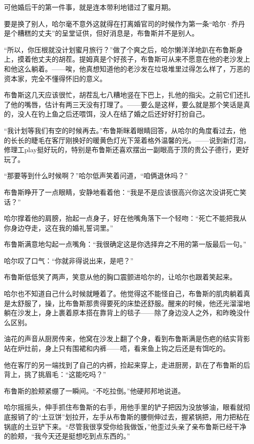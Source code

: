 \documentclass[../main]{subfiles}
\begin{document}
可他婚后干的第一件事，就是连本带利地错过了蜜月期。

要是换了别人，哈尔毫不意外这就得在打离婚官司的时候作为第一条“哈尔·乔丹是个糟糕的丈夫”的呈堂证供，但好消息是，布鲁斯并不是别人。

“所以，你压根就没计划蜜月旅行？”做了个爽之后，哈尔懒洋洋地趴在布鲁斯身上，摸着他丈夫的胡茬。提姆真是个好孩子，布鲁斯可从来不愿意在他的老沙发上和他这么躺着。——唉，他真想知道他的老沙发在垃圾堆里过得怎么样了，万恶的资本家，完全不懂得怀旧的意义。

布鲁斯这几天应该很忙，胡茬乱七八糟地竖在下巴上，扎他的指尖。之前它们还扎了他的嘴唇，估计有两三天没有打理了。——要么是这样，要么就是那个笑话是真的，没人在钓上鱼之后还喂饵，没人在结了婚之后还好好打扮自己。

“我计划等我们有空的时候再去。”布鲁斯眯着眼睛回答，从哈尔的角度看过去，他的长长的睫毛在客厅刚换好的暖黄色灯光下笼着格外温馨的光。——说到新灯泡，修理工play挺好玩的，特别是布鲁斯还喜欢摆出一副眼高于顶的贵公子德行，更好玩了。

“那要等到什么时候啊？”哈尔低声笑着问道，“咱俩退休吗？”

布鲁斯睁开了一点眼睛，安静地看着他：“我是不是应该很高兴你这次没讲死亡笑话？”

哈尔撑着他的肩膀，抬起一点身子，好在他嘴角落下一个轻吻：“死亡不能把我从你身边夺走，这在我的婚礼誓词里。”

布鲁斯满意地勾起一点嘴角：“我很确定这是你选择弃之不用的第一版最后一句。”

哈尔叹了口气：“你就非得说出来，是吧？”

布鲁斯低低笑了两声，笑意从他的胸口震颤进哈尔的，让哈尔也跟着笑起来。

哈尔也不知道自己什么时候就睡着了。他觉得这不能怪自己，布鲁斯的肌肉躺着真是太舒服了，操，比布鲁斯那贵得要死的床垫还舒服。醒来的时候，他还光溜溜地躺在沙发上，身上裹着原本搭在靠背上的毯子——除了身边没人之外，和昨晚没什么区别。

油花的声音从厨房传来，他窝在沙发上翻了个身，看到布鲁斯满是伤疤的结实背影站在炉灶前，身上只有围裙和内裤——唔，看来鱼上钩之后还是有饵吃的。

他在客厅的另一端找到了自己的内裤，捡起来穿上，走进厨房，趴在了布鲁斯的后背上，挑了挑眉毛：“这能吃吗？”

布鲁斯的脸颊紧绷了一瞬间。“不吃拉倒。”他硬邦邦地说道。

哈尔摇摇头，伸手抓住布鲁斯的右手，用他手里的铲子把因为没放够油，眼看就彻底报销了的“土豆饼”划拉开，左手从布鲁斯的腰侧伸过去，握紧锅把，用力把粘在锅底的土豆铲下来。“尽管我很享受你给我做饭，”他歪过头亲了亲布鲁斯已经干净的脸颊，“我今天还是挺想吃到点东西的。”
\end{document}
